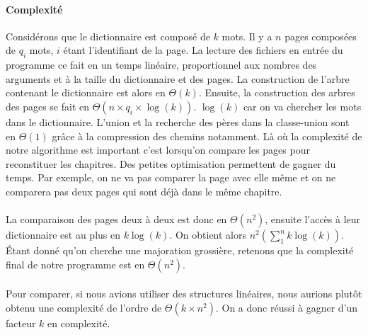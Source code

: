 \documentclass[a4paper]{article}
\begin{document}
		 	\paragraph{Complexité}{
		 	Considérons que le dictionnaire est composé de $k$ mots. Il y a $n$ pages composées de
		 	$q_{i}$ mots, $i$ étant l'identifiant de la page. \newline
		 	La lecture des fichiers en entrée du programme ce fait en un temps linéaire, proportionnel aux
		 	nombres des arguments et à la taille du dictionnaire et des pages. La construction de l'arbre
		 	contenant le dictionnaire est alors en $\Theta(k)$. \newline
		 	Ensuite, la construction des arbres des pages se fait en $\Theta(n \times q_{i} \times \log(k))$.
		 	$\log(k)$ car on va chercher les mots dans le dictionnaire.
		 	L'union et la recherche des pères dans la classe-union sont en $\Theta(1)$ grâce à la compression des
		 	chemins notamment. Là où la complexité de notre algorithme est important c'est lorsqu'on compare les pages
		 	pour reconstituer les chapitres. Des petites optimisation permettent de gagner du temps. Par exemple,
		 	on ne va pas comparer la page avec elle même et on ne comparera pas deux pages qui sont déjà dans le
		 	même chapitre.
		 	} %
		 	\paragraph{}{
		 	La comparaison des pages deux à deux est donc en $\Theta(n^{2})$, ensuite l'accès à leur
		 	dictionnaire est au plus en $k\log(k)$. On obtient alors $n^{2}( \sum_{1}^{n} k\log(k))$.
		 	Étant donné qu'on cherche une majoration grossière, retenons que la complexité final de 
		 	notre programme est en $\Theta(n^{2})$.
		 	}
		 	\paragraph{}{
		 	Pour comparer, si nous avions utiliser des structures linéaires, nous aurions plutôt obtenu une
		 	complexité de l'ordre de $\Theta(k \times n^{2})$. On a donc réussi à gagner d'un facteur $k$
		 	en complexité.
		 	}
		 	
\end{document}
